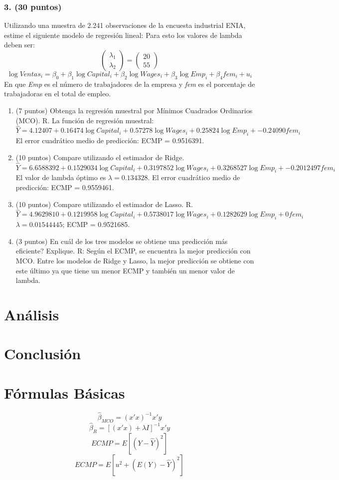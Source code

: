 \documentclass[twocolumn, 11pt, letterpaper]{article}
\begin{document}
\subsubsection*{3. (30 puntos)} Utilizando una muestra de 2.241 observaciones de la encuesta industrial ENIA, estime el siguiente modelo de regresión lineal:
Para esto los valores de lambda deben ser:
$$ \begin{pmatrix} \lambda_1 \\ \lambda_2 \end{pmatrix} = \begin{pmatrix} 20 \\ 55 \end{pmatrix} $$
$$ \log Ventas_i = \beta_0+\beta_1 \log Capital_i + \beta_2 \log Wages_i + \beta_3 \log Emp_i + \beta_4 fem_i+u_i $$
En que \textit{Emp} es el número de trabajadores de la empresa y \textit{fem} es el porcentaje de trabajadoras en el total de empleo.
\begin{enumerate}[label=\alph*)]
    \item (7 puntos) Obtenga la regresión muestral por Mínimos Cuadrados Ordinarios (MCO).
    R. La función de regresión muestral:
    $$ \hat{Y} = 4.12407+0.16474 \log Capital_i + 0.57278 \log Wages_i + 0.25824 \log Emp_i + -0.24090 fem_i $$
    El error cuadrático medio de predicción: ECMP = 0.9516391.
    \item (10 puntos) Compare utilizando el estimador de Ridge.
    $$ \hat{Y} = 6.6588392 + 0.1529034 \log Capital_i + 0.3197852 \log Wages_i + 0.3268527 \log Emp_i + -0.2012497 fem_i $$
    El valor de lambda óptimo es $\lambda = 0.134328$. El error cuadrático medio de predicción: ECMP = 0.9559461.
    \item (10 puntos) Compare utilizando el estimador de Lasso.
    R.
    $$ \hat{Y} = 4.9629810 + 0.1219958 \log Capital_i + 0.5738017 \log Wages_i + 0.1282629 \log Emp_i + 0 fem_i $$
    $\lambda=0.01544445$; ECMP = 0.9521685.
    \item (3 puntos) En cuál de los tres modelos se obtiene una predicción más eficiente? Explique.
    R: Según el ECMP, se encuentra la mejor predicción con MCO. Entre los modelos de Ridge y Lasso, la mejor predicción se obtiene con este último ya que tiene un menor ECMP y también un menor valor de lambda.
\end{enumerate}

\section*{Análisis}

\section*{Conclusión}

\section*{Fórmulas Básicas}
$$ \hat{\beta}_{MCO} = (x'x)^{-1}x'y $$
$$ \hat{\beta}_R = [(x'x) + \lambda I]^{-1}x'y $$
$$ ECMP = E[(Y - \hat{Y})^2] $$
$$ ECMP = E[u^2 + (E(Y) - \hat{Y})^2] $$
\end{document}
